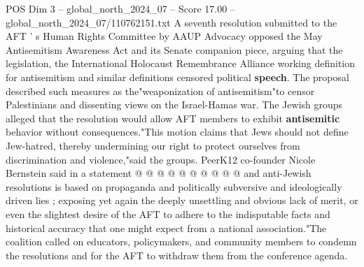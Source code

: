 \begin{textsample}{POS Dim 3 – global\_north\_2024\_07 – Score 17.00 – global\_north\_2024\_07/110762151.txt}
A seventh resolution submitted to the AFT ' s Human Rights Committee by AAUP Advocacy opposed the May Antisemitism Awareness Act and its Senate companion piece, arguing that the legislation, the International Holocaust Remembrance Alliance working definition for antisemitism and similar definitions censored political \textbf{speech}.
The proposal described such measures as the"weaponization of antisemitism"to censor Palestinians and dissenting views on the Israel-Hamas war.
The Jewish groups alleged that the resolution would allow AFT members to exhibit \textbf{antisemitic} behavior without consequences."This motion claims that Jews should not define Jew-hatred, thereby undermining our right to protect ourselves from discrimination and violence,"said the groups.
PeerK12 co-founder Nicole Bernstein said in a statement @ @ @ @ @ @ @ @ @ @ and anti-Jewish resolutions is based on propaganda and politically subversive and ideologically driven lies ; exposing yet again the deeply unsettling and obvious lack of merit, or even the slightest desire of the AFT to adhere to the indisputable facts and historical accuracy that one might expect from a national association."The coalition called on educators, policymakers, and community members to condemn the resolutions and for the AFT to withdraw them from the conference agenda.

\end{textsample}
